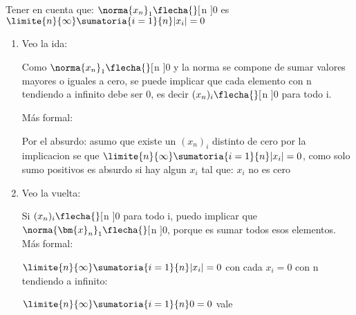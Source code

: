 
\medskip

Tener en cuenta que: $\norma{x_n}_1 \flecha{}[$n \to \infty$] 0$ es $\limite{n}{\infty} \sumatoria{i=1}{n} |x_i| = 0$

\begin{enumerate}[label=(\roman*)]
  \item Veo la ida:

        Como $\norma{x_n}_1 \flecha{}[$n \to \infty$] 0$ y la norma se compone de sumar valores mayores o iguales a cero, se puede
        implicar que cada elemento con n tendiendo a infinito debe ser 0, es decir $(x_n)_i \flecha{}[$n \to \infty$] 0$ para todo i.

        Más formal:

        Por el absurdo: asumo que existe un $(x_n)_i$ distinto de cero
        por la implicacion se que $\limite{n}{\infty} \sumatoria{i=1}{n} |x_i| = 0$,
        como solo sumo positivos es absurdo si hay algun $x_i$ tal que: $x_i$ no es cero

  \item Veo la vuelta:

        Si $(x_n)_i \flecha{}[$n \to \infty$] 0$ para todo i, puedo implicar  que
        $\norma{\bm{x}_n}_1 \flecha{}[$n \to \infty$] 0$, porque es sumar todos esos elementos. Más formal:

        $\limite{n}{\infty} \sumatoria{i=1}{n} |x_i| = 0$ con cada $x_i = 0$ con n tendiendo a infinito:

        $\limite{n}{\infty} \sumatoria{i=1}{n} 0 = 0$ vale
\end{enumerate}

\begin{aportes}
  \item {}
\end{aportes}
